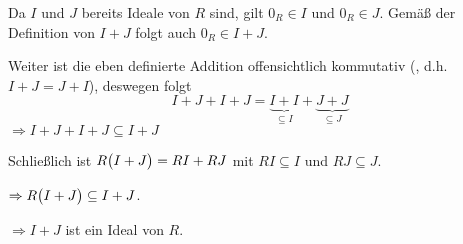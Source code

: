 \documentclass{scrreprt}
\begin{document}
\begin{enumerate}[(i)]
  Da $I$ und $J$ bereits Ideale von $R$ sind, gilt $0_R \in I$ und $0_R \in J$.
  Gemäß der Definition von $I + J$ folgt auch $0_R \in I + J$.

  Weiter ist die eben definierte Addition offensichtlich kommutativ
  (, d.h. $I + J = J + I$), deswegen folgt
  \[
    I + J + I + J =
    \underset{\subseteq I}{\underbrace{I + I}} +
    \underset{\subseteq J}{\underbrace{J + J}}
  \]
  $\Rightarrow I + J + I + J \subseteq I + J$

  Schließlich ist $R\qty\big(I + J) = RI + RJ$ mit
  $RI \subseteq I$ und $RJ \subseteq J$.

  $\Rightarrow R\qty\big(I + J) \subseteq I + J$.

  $\Rightarrow I + J$ ist ein Ideal von $R$.
\end{enumerate}
\end{document}
